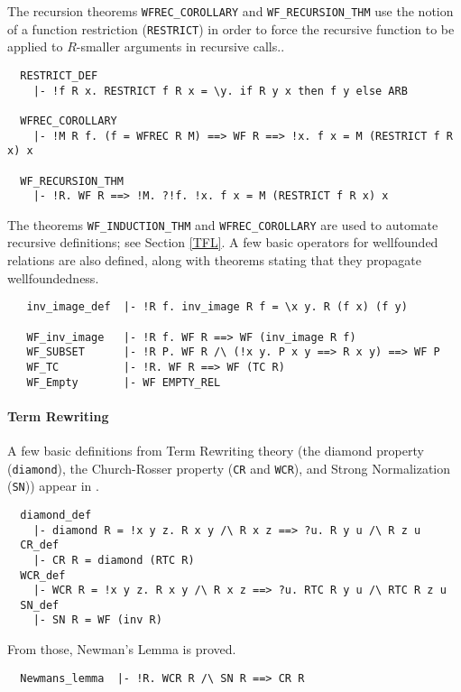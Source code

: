 The recursion theorems {\small\verb+WFREC_COROLLARY+} and
{\small\verb+WF_RECURSION_THM+} use the notion of a function
restriction ({\small\verb+RESTRICT+}) in order to force the recursive
function to be applied to $R$-smaller arguments in recursive calls..
%
\begin{hol}
{\small
\begin{verbatim}
  RESTRICT_DEF
    |- !f R x. RESTRICT f R x = \y. if R y x then f y else ARB

  WFREC_COROLLARY
    |- !M R f. (f = WFREC R M) ==> WF R ==> !x. f x = M (RESTRICT f R x) x

  WF_RECURSION_THM
    |- !R. WF R ==> !M. ?!f. !x. f x = M (RESTRICT f R x) x
\end{verbatim}}
\end{hol}

\noindent The theorems {\small\verb+WF_INDUCTION_THM+} and
{\small\verb+WFREC_COROLLARY+} are used to automate recursive
definitions; see Section \ref{TFL}. A few basic operators for
wellfounded relations are also defined, along with theorems stating
that they propagate wellfoundedness.

\begin{hol}
\begin{verbatim}
   inv_image_def  |- !R f. inv_image R f = \x y. R (f x) (f y)

   WF_inv_image   |- !R f. WF R ==> WF (inv_image R f)
   WF_SUBSET      |- !R P. WF R /\ (!x y. P x y ==> R x y) ==> WF P
   WF_TC          |- !R. WF R ==> WF (TC R)
   WF_Empty       |- WF EMPTY_REL
\end{verbatim}
\end{hol}

\paragraph {Term Rewriting}

A few basic definitions from Term Rewriting theory
(the diamond property (\verb+diamond+), the Church-Rosser
property ({\small\verb+CR+} and {\small\verb+WCR+}), and Strong
Normalization ({\small\verb+SN+})) appear
in .
%
\begin{hol}
{\small
\begin{verbatim}
  diamond_def
    |- diamond R = !x y z. R x y /\ R x z ==> ?u. R y u /\ R z u
  CR_def
    |- CR R = diamond (RTC R)
  WCR_def
    |- WCR R = !x y z. R x y /\ R x z ==> ?u. RTC R y u /\ RTC R z u
  SN_def
    |- SN R = WF (inv R)
\end{verbatim}}
\end{hol}
%
\noindent From those, Newman's Lemma is proved.
%
\begin{hol}
{\small
\begin{verbatim}
  Newmans_lemma  |- !R. WCR R /\ SN R ==> CR R
\end{verbatim}}
\end{hol}

